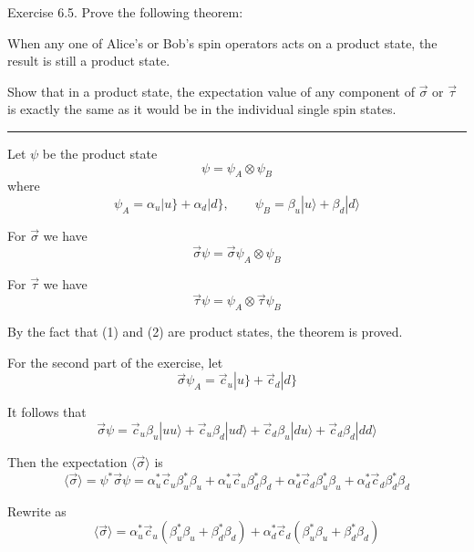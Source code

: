 \documentclass[12pt]{article}
\begin{document}
Exercise 6.5.
Prove the following theorem:

\bigskip
When any one of Alice's or Bob's spin operators acts on a
product state, the result is still a product state.

\bigskip
Show that in a product state, the expectation value of any
component of $\vec\sigma$ or $\vec\tau$ is exactly the same as it
would be in the individual single spin states.

\bigskip
\hrule

\bigskip
Let $\psi$ be the product state
\begin{equation*}
\psi=\psi_A\otimes\psi_B
\end{equation*}
where
\begin{equation*}
\psi_A=\alpha_u|u\}+\alpha_d|d\},
\qquad
\psi_B=\beta_u|u\rangle+\beta_d|d\rangle
\end{equation*}

For $\vec\sigma$ we have
\begin{equation*}
\vec\sigma\psi=\vec\sigma\psi_A\otimes\psi_B
\tag{1}
\end{equation*}

For $\vec\tau$ we have
\begin{equation*}
\vec\tau\psi=\psi_A\otimes\vec\tau\psi_B
\tag{2}
\end{equation*}

By the fact that (1) and (2) are product states, the theorem is proved.

\bigskip
For the second part of the exercise, let
\begin{equation*}
\vec\sigma\psi_A=\vec c_u|u\}+\vec c_d|d\}
\end{equation*}

It follows that
\begin{equation*}
\vec\sigma\psi=\vec c_u\beta_u|uu\rangle+\vec c_u\beta_d|ud\rangle+\vec c_d\beta_u|du\rangle+\vec c_d\beta_d|dd\rangle
\end{equation*}

Then the expectation $\langle\vec\sigma\rangle$ is
\begin{equation*}
\langle\vec\sigma\rangle=\psi^*\vec\sigma\psi
=\alpha_u^*\vec c_u\beta_u^*\beta_u+\alpha_u^*\vec c_u\beta_d^*\beta_d
+\alpha_d^*\vec c_d\beta_u^*\beta_u+\alpha_d^*\vec c_d\beta_d^*\beta_d
\end{equation*}

Rewrite as
\begin{equation*}
\langle\vec\sigma\rangle=\alpha_u^*\vec c_u(\beta_u^*\beta_u+\beta_d^*\beta_d)
+\alpha_d^*\vec c_d(\beta_u^*\beta_u+\beta_d^*\beta_d)
\end{equation*}
\end{document}
